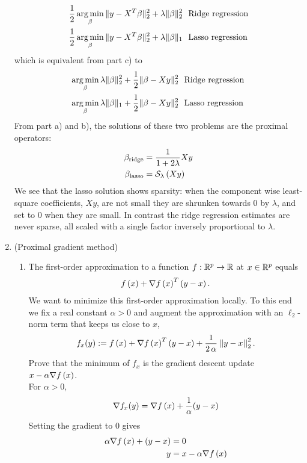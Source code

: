 \documentclass[12pt,twoside]{article}
\begin{document}
\begin{enumerate}
\begin{align*}
\frac{1}{2} \operatorname*{arg\,min}_\beta \| y - X^T \beta\|_2^2 + \lambda \|\beta\|_2^2	& \text{~ Ridge regression} \\
\frac{1}{2} \operatorname*{arg\,min}_\beta \| y - X^T \beta\|_2^2 + \lambda \|\beta\|_1	& \text{~ Lasso regression}
\end{align*} 
which is equivalent from part c) to
\begin{align*}
 \operatorname*{arg\,min}_\beta  \lambda \|\beta\|_2^2 + \frac{1}{2} \| \beta - X y \|_2^2 	& \text{~ Ridge regression} \\
 \operatorname*{arg\,min}_\beta   \lambda \|\beta\|_1+    \frac{1}{2} \| \beta - X y \|_2^2 	& \text{~ Lasso regression}
\end{align*} 
From part a) and b), the solutions of these two problems are the proximal operators:
\begin{align*}
	\beta_{\text{ridge}}	&= 	 \frac{1} {1+2 \lambda} X y \\
	\beta_{\text{lasso}}	&= 	  \mathcal{ S }_{\lambda}\left( X y \right)\\
\end{align*} 
We see that the lasso solution shows sparsity: when the component wise least-square coefficients, $X y$, are not small they are shrunken towards $0$ by $\lambda$, and set to $0$ when they are small.
In contrast the ridge regression estimates are never sparse, all scaled with a single factor inversely proportional to $\lambda$.
 
 \newpage
  \item (Proximal gradient method)   
 \begin{enumerate}
 \item The first-order approximation to a function $f:\mathbb{R}^{p}\rightarrow \mathbb{R}$ at $x \in \mathbb{R}^{p}$ equals
 \begin{align}
f\left( x \right) + \nabla f\left( x \right)^T\left( y-x \right). 
\end{align}
We want to minimize this first-order approximation locally. To this end we fix a real constant $\alpha >0$ and augment the approximation with an $\ell_2$-norm term that keeps us close to $x$,
 \begin{align}
f_{x}(y) :=f\left( x \right) + \nabla f\left( x \right)^T\left( y-x \right) +  \frac{1}{2 \, \alpha }\left|\left| y-x \right|\right| _{2}^2.
\end{align}
 Prove that the minimum of $f_{x}$ is the gradient descent update $x- \alpha \nabla f\left( x \right)$.\\
 For $\alpha > 0$,
 \begin{align*}
 	\nabla f_{x}(y) &= \nabla f\left( x \right) +   \frac{1}{\alpha } (y - x) \\
 \end{align*} 
 Setting the gradient to $0$ gives
 \begin{align*}
 	\alpha \nabla f\left( x \right) + (y - x)  &= 0\\
	y &= x - \alpha \nabla f\left( x \right) \\
 \end{align*} 
 

\end{enumerate}
\end{enumerate}
\end{document}
